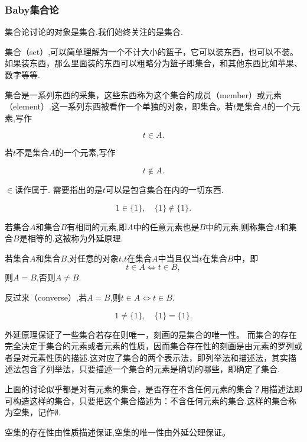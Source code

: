 \subsubsection{Baby集合论}

\begin{note} 集合论讨论的对象是集合.我们始终关注的是集合.

    集合（set）,可以简单理解为一个不计大小的篮子，它可以装东西，也可以不装。如果装东西，那么里面装的东西可以粗略分为篮子即集合，和其他东西比如苹果、数字等等.
\end{note}

集合是一系列东西的采集，这些东西称为这个集合的成员（member）或元素（element）.这一系列东西被看作一个单独的对象，即集合。若$t$是集合$A$的一个元素,写作

\[t\in A.\]

若$t$不是集合$A$的一个元素,写作

\[t\notin A.\]

$\in$读作属于.
需要指出的是$t$可以是包含集合在内的一切东西.
\begin{example}
    \[1\in\{1\},\quad
    \{1\}\notin\{1\}.\]
\end{example}
若集合$A$和集合$B$有相同的元素,即$A$中的任意元素也是$B$中的元素,则称集合$A$和集合$B$是相等的.这被称为外延原理.

\begin{proposition}
    [外延原理]
    若集合$A$和集合$B$,对任意的对象$t$,$t$在集合$A$中当且仅当$t$在集合$B$中，即
    \[t\in A \iff t\in B,\]
    则$A=B$,否则$A\ne B$.
\end{proposition}

反过来（converse）,若$A=B$,则$t\in A\iff t\in B.$

\begin{example}
    \[1\ne\{1\},\quad \{1\}=\{1\}.\]
\end{example}

\begin{note}
    外延原理保证了一些集合若存在则唯一，刻画的是集合的唯一性。
    而集合的存在完全决定于集合的元素或者元素的性质，因而集合存在性的刻画是由元素的罗列或者是对元素性质的描述.这对应了集合的两个表示法，即列举法和描述法，其实描述法包含了列举法，只要描述一个集合的元素是确切的哪些，即确定了集合.
\end{note}

上面的讨论似乎都是对有元素的集合，是否存在不含任何元素的集合？用描述法即可构造这样的集合，只要把这个集合描述为：不含任何元素的集合.这样的集合称为空集，记作$\emptyset$.

\begin{note}
    空集的存在性由性质描述保证,空集的唯一性由外延公理保证。
\end{note}

